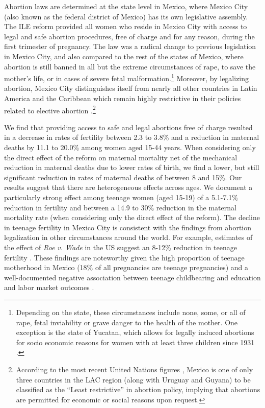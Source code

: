 \documentclass[a4paper, 11pt]{article}
\begin{document}
\begin{spacing}{2}
Abortion laws are determined at the state level in Mexico, where Mexico City (also known as the federal district of Mexico) has its own legislative assembly.  The ILE reform provided all women who reside in Mexico City with access to legal and safe abortion procedures, free of charge and for any reason, during the first trimester of pregnancy. The law was a radical change to previous legislation in Mexico City, and also compared to the rest of the states of Mexico, where abortion is still banned in all but the extreme circumstances of rape, to save the mother's life, or in cases of severe fetal malformation.\footnote{Depending on the state, these circumstances include none, some, or all of rape, fetal inviability or grave danger to the health of the mother. One exception is the state of Yucatan, which allows for legally induced abortions for socio economic reasons for women with at least three children since 1931 \citep{GIRE2009}.} Moreover, by legalizing abortion, Mexico City distinguishes itself from nearly all other countries in Latin America and the Caribbean which remain highly restrictive in their policies related to elective abortion \citep{Fraser2015}.\footnote{According to the most recent United Nations figures \citep{UN2014}, Mexico is one of only three countries in the LAC region (along with Uruguay and Guyana) to be classified as the ``Least restrictive'' in abortion policy, implying that abortions are permitted for economic or social reasons upon request.}

We find that providing access to safe and legal abortions free of charge resulted in a decrease in rates of fertility between 2.3 to 3.8\% and a reduction in maternal deaths by 11.1 to 20.0\% among women aged 15-44 years.  When considering only the direct effect of the reform on maternal mortality net of the mechanical reduction in maternal deaths due to lower rates of birth, we find a lower, but still significant reduction in rates of maternal deaths of between 8 and 15\%.  Our results suggest that there are heterogeneous effects across ages. We document a particularly strong effect among teenage women (aged 15-19) of a 5.1-7.1\% reduction in fertility and between a 14.9 to 30\% reduction in the maternal mortality rate (when considering only the direct effect of the reform). The decline in teenage fertility in Mexico City is consistent with the findings from abortion legalization in other circumstances around the world.  For example, estimates of the effect of \textit{Roe v. Wade} in the US suggest an 8-12\% reduction in teenage fertility \citep{AngristEvans}. These findings are noteworthy given the high proportion of teenage motherhood in Mexico (18\% of all pregnancies are teenage pregnancies) and a well-documented negative association between teenage childbearing and education and labor market outcomes \citep{furstenberg1976unplanned}. 


\end{spacing}
\end{document}
